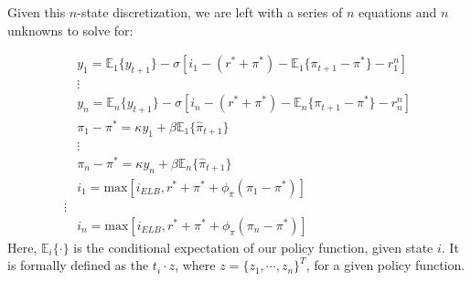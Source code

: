 \documentclass[11pt]{article}
\begin{document}
\begin{singlespace}
		Given this  $n$-state discretization, we are left with a series of $n$ equations and $n$ unknowns to solve for: 

		\begin{align*}
		& y_{1} = \mathbb{E}_1\{y_{t+1}\} - \sigma\left[i_1 - (r^* + \pi^*) - \mathbb{E}_1\{\pi_{t+1} - \pi^*\}-r_1^n\right] \\
		&\vdots \nonumber\\
		& y_{n} = \mathbb{E}_n\{y_{t+1}\} - \sigma\left[i_n - (r^* + \pi^*) - \mathbb{E}_n\{\pi_{t+1} - \pi^*\}-r_n^n\right]\\ 
		& \pi_1 - \pi^* = \kappa y_1 + \beta\mathbb{E}_1\{\hat{\pi}_{t+1}\}\\
		&\vdots \nonumber\\
		& \pi_n - \pi^* = \kappa y_n + \beta\mathbb{E}_n\{\hat{\pi}_{t+1}\}\\
		& i_1 = \text{max}\left[i_{ELB},r^* + \pi^* + \phi_{\pi}(\pi_1 - \pi^*)\right]\\
		\vdots \nonumber\\
		& i_n = \text{max}\left[i_{ELB},r^* + \pi^* + \phi_{\pi}(\pi_n - \pi^*)\right]
		\end{align*}
		Here, $\mathbb{E}_i\{\cdot\}$ is the conditional expectation of our policy function, given state $i$. It is formally defined as the $t_i\cdot z$, where $z = \{z_1,\cdots,z_n\}^{T}$, for a given policy function. 
		

\end{singlespace}
\end{document}
